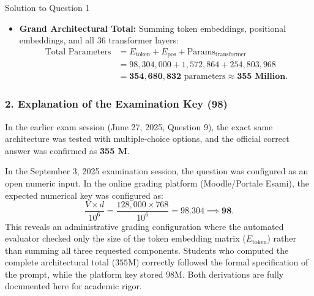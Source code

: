 \documentclass[11pt,a4paper]{article}
\begin{document}
\begin{solutionbox}{Solution to Question 1}
\begin{itemize}[leftmargin=1.5cm]
\begin{itemize}
        \item \textbf{Total for $L = 36$ Layers:}
        \begin{equation*}
        \text{Params}_{\text{transformer}} = 36 \times 7{,}077{,}888 = 254{,}803{,}968 \text{ parameters}.
        \end{equation*}
    \end{itemize}

    \item[\textbf{d)}] \textbf{Grand Architectural Total:}
    Summing token embeddings, positional embeddings, and all 36 transformer layers:
    \begin{align*}
    \text{Total Parameters} &= E_{\text{token}} + E_{\text{pos}} + \text{Params}_{\text{transformer}} \\
    &= 98{,}304{,}000 + 1{,}572{,}864 + 254{,}803{,}968 \\
    &= \mathbf{354{,}680{,}832} \text{ parameters} \approx \mathbf{355 \text{ Million}}.
    \end{align*}
\end{itemize}

\subsubsection*{2. Explanation of the Examination Key (98)}
In the earlier exam session (June 27, 2025, Question 9), the exact same architecture was tested with multiple-choice options, and the official correct answer was confirmed as \textbf{355 M}.

In the September 3, 2025 examination session, the question was configured as an open numeric input. In the online grading platform (Moodle/Portale Esami), the expected numerical key was configured as:
\begin{equation*}
\frac{V \times d}{10^6} = \frac{128{,}000 \times 768}{10^6} = 98.304 \implies \mathbf{98}.
\end{equation*}
This reveals an administrative grading configuration where the automated evaluator checked only the size of the token embedding matrix ($E_{\text{token}}$) rather than summing all three requested components. Students who computed the complete architectural total ($355\text{M}$) correctly followed the formal specification of the prompt, while the platform key stored $98\text{M}$. Both derivations are fully documented here for academic rigor.
\end{solutionbox}

\bigskip
\end{document}
